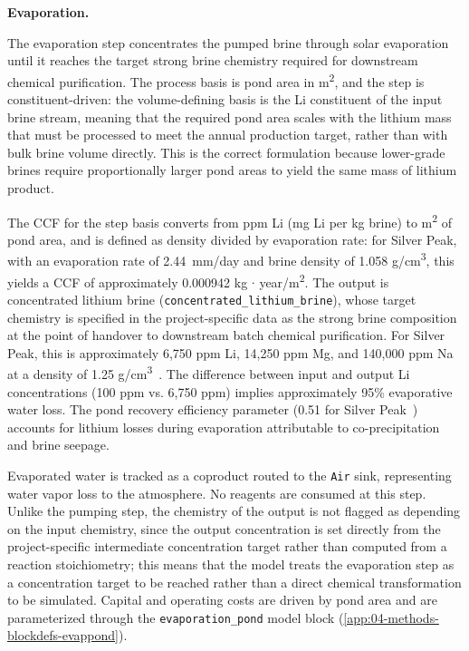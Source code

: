 \medskip
\noindent\textbf{Evaporation.}\quad

The evaporation step concentrates the pumped brine through solar evaporation until it reaches the target strong brine chemistry required for downstream chemical purification. The process basis is pond area in m\textsuperscript{2}, and the step is constituent-driven: the volume-defining basis is the Li constituent of the input brine stream, meaning that the required pond area scales with the lithium mass that must be processed to meet the annual production target, rather than with bulk brine volume directly. This is the correct formulation because lower-grade brines require proportionally larger pond areas to yield the same mass of lithium product.

The CCF for the step basis converts from ppm Li (mg Li per kg brine) to m\textsuperscript{2} of pond area, and is defined as density divided by evaporation rate: for Silver Peak, with an evaporation rate of 2.44~mm/day and brine density of 1.058 g/cm\textsuperscript{3}, this yields a CCF of approximately 0.000942 kg $\cdot$ year/m\textsuperscript{2}. The output is concentrated lithium brine (\texttt{concentrated\_lithium\_brine}), whose target chemistry is specified in the project-specific data as the strong brine composition at the point of handover to downstream batch chemical purification. For Silver Peak, this is approximately 6,750 ppm Li, 14,250 ppm Mg, and 140,000 ppm Na at a density of 1.25 g/cm\textsuperscript{3}~\cite{srkconsultingSECTechnicalReport2023a}. The difference between input and output Li concentrations (100 ppm vs. 6,750 ppm) implies approximately 95\% evaporative water loss. The pond recovery efficiency parameter (0.51 for Silver Peak~\cite{srkconsultingSECTechnicalReport2023a}) accounts for lithium losses during evaporation attributable to co-precipitation and brine seepage.

Evaporated water is tracked as a coproduct routed to the \texttt{Air} sink, representing water vapor loss to the atmosphere. No reagents are consumed at this step. Unlike the pumping step, the chemistry of the output is not flagged as depending on the input chemistry, since the output concentration is set directly from the project-specific intermediate concentration target rather than computed from a reaction stoichiometry; this means that the model treats the evaporation step as a concentration target to be reached rather than a direct chemical transformation to be simulated. Capital and operating costs are driven by pond area and are parameterized through the \texttt{evaporation\_pond} model block (\ref{app:04-methods-blockdefs-evappond}).


